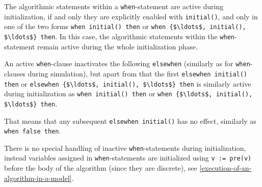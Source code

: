 The algorithmic statements within a \lstinline!when!-statement are active during initialization, if and only they are explicitly enabled with \lstinline!initial()!, and only in one of the two forms \lstinline!when initial() then! or \lstinline!when {$\ldots$, initial(), $\ldots$} then!.
In this case, the algorithmic statements within the \lstinline!when!-statement remain active during the whole initialization phase.

An active \lstinline!when!-clause inactivates the following \lstinline!elsewhen! (similarly as for \lstinline!when!-clauses during simulation), but apart from that the first \lstinline!elsewhen initial() then! or \lstinline!elsewhen {$\ldots$, initial(), $\ldots$} then! is similarly active during initialization as \lstinline!when initial() then! or \lstinline!when {$\ldots$, initial(), $\ldots$} then!.

\begin{nonnormative}
That means that any subsequent \lstinline!elsewhen initial()! has no effect,
similarly as \lstinline!when false then!.
\end{nonnormative}

\begin{nonnormative}
There is no special handling of inactive \lstinline!when!-statements during initialization, instead variables assigned in \lstinline!when!-statements are initialized using \lstinline!v := pre(v)! before the body of the algorithm (since they are discrete), see \cref{execution-of-an-algorithm-in-a-model}.
\end{nonnormative}


